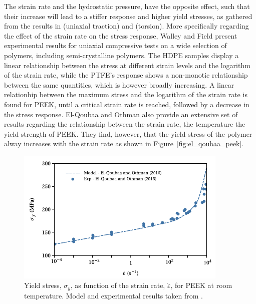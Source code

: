 The strain rate and the hydrostatic pressure, have the opposite effect, such that their increase will lead to a stiffer response and higher yield stresses, as gathered from the results in \cite{popelarViscoelasticMaterialCharacterization1990} (uniaxial traction) and \cite{trussEffectHydrostaticPressure1981} (torsion).
More specifically regarding the effect of the strain rate on the stress response, Walley and Field \citep{walleyStrainRateSensitivity1994} present experimental results for uniaxial compressive tests on a wide selection of polymers, including semi-crystalline polymers.
The HDPE samples display a linear relationship between the stress at different strain levels and the logarithm of the strain rate, while the PTFE's response shows a non-monotic relationship between the same quantities, which is however broadly increasing.
A linear relationhip between the maximum stress and the logarithm of the strain rate is found for PEEK, until a critical strain rate is reached, followed by a decrease in the stress response.
El-Qoubaa and Othman \citep{el-qoubaaStrainRateSensitivity2016} also provide an extensive set of results regarding the relationship between the strain rate, the temperature the yield strength of PEEK.
They find, however, that the yield stress of the polymer alway increases with the strain rate as shown in Figure~\ref{fig:el_qoubaa_peek}.
\begin{figure}[hbtp]
	\centering
	\includegraphics[width=0.9\textwidth]{figures/yield_el_qoubaa_peek}
	\caption{Yield stress, $\sigma_y$, as function of the strain rate, $\dot \varepsilon$, for PEEK at room temperature. Model and experimental results taken from \cite{el-qoubaaStrainRateSensitivity2016}.}
\label{fig:yield_el_qoubaa_peek}
\end{figure}


